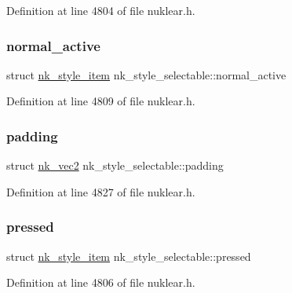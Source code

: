 Definition at line 4804 of file nuklear.\+h.

\mbox{\label{structnk__style__selectable_a7e73c516836b8d0574a1b32f8429a0f2}} 
\subsubsection{\texorpdfstring{normal\+\_\+active}{normal\_active}}
{\footnotesize\ttfamily struct \mbox{\hyperlink{structnk__style__item}{nk\+\_\+style\+\_\+item}} nk\+\_\+style\+\_\+selectable\+::normal\+\_\+active}



Definition at line 4809 of file nuklear.\+h.

\mbox{\label{structnk__style__selectable_a2c770699aeb61661fc489c3c6f8e29fb}} 
\subsubsection{\texorpdfstring{padding}{padding}}
{\footnotesize\ttfamily struct \mbox{\hyperlink{structnk__vec2}{nk\+\_\+vec2}} nk\+\_\+style\+\_\+selectable\+::padding}



Definition at line 4827 of file nuklear.\+h.

\mbox{\label{structnk__style__selectable_ae86d07f5a16c62c546c95afddb3ef33d}} 
\subsubsection{\texorpdfstring{pressed}{pressed}}
{\footnotesize\ttfamily struct \mbox{\hyperlink{structnk__style__item}{nk\+\_\+style\+\_\+item}} nk\+\_\+style\+\_\+selectable\+::pressed}



Definition at line 4806 of file nuklear.\+h.

